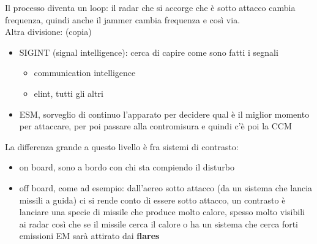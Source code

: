 \documentclass[oneside, 12pt]{extbook}
\begin{document}
Il processo diventa un loop: il radar che si accorge che è sotto attacco cambia frequenza, quindi anche il jammer cambia frequenza e così via.
\\Altra divisione:
(copia)
\begin{itemize}
	\item SIGINT (signal intelligence): cerca di capire come sono fatti i segnali
	\begin{itemize}
		\item communication intelligence
		\item elint, tutti gli altri
	\end{itemize}
	\item ESM, sorveglio di continuo l'apparato per decidere qual è il miglior momento per attaccare, per poi passare alla contromisura e quindi c'è poi la CCM
\end{itemize}
La differenza grande a questo livello è fra sistemi di contrasto:
\begin{itemize}
	\item on board, sono a bordo con chi sta compiendo il disturbo
	\item off board, come ad esempio: dall'aereo sotto attacco (da un sistema che lancia missili a guida) ci si rende conto di essere sotto attacco, un contrasto è lanciare una specie di missile che produce molto calore, spesso molto visibili ai radar così che se il missile cerca il calore o ha un sistema che cerca forti emissioni EM sarà attirato dai \textbf{flares}
\end{itemize}
\end{document}
